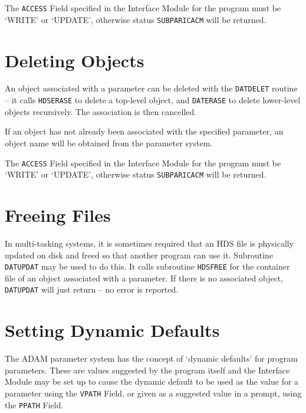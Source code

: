 \documentclass[twoside,11pt]{article}
\newcommand{\htmlref}[2]{#1}
\newcommand{\xref}[3]{#1}
\newcommand{\xlabel}[1]{}
\renewcommand{\_}{\texttt{\symbol{95}}}
\begin{document}
The
\xref{\texttt{ACCESS} Field}{sun115}{the_access_field}
specified in the Interface Module for the program must be `WRITE' or `UPDATE',
otherwise status \texttt{SUBPAR\_ICACM} will be returned.

\section{\xlabel{deleting_objects}Deleting Objects}
An object associated with a parameter can be deleted with the
\htmlref{\texttt{DAT\_DELET}}{DAT_DELET}
routine -- it calls
\xref{\texttt{HDS\_ERASE}}{sun92}{HDS_ERASE}
to delete a top-level object, and
\xref{\texttt{DAT\_ERASE}}{sun92}{DAT_ERASE}
to delete lower-level objects recursively.
The association is then cancelled.

If an object has not already been associated with the specified parameter,
an object name will be obtained from the parameter system.

The
\xref{\texttt{ACCESS} Field}{sun115}{the_access_field}
specified in the Interface Module for the program must be `WRITE' or `UPDATE',
otherwise status \texttt{SUBPAR\_ICACM} will be returned.

\section{\xlabel{freeing_files}Freeing Files}
In multi-tasking systems, it is sometimes required that an HDS file is
physically updated on disk and freed so that another program can use it.
Subroutine
\htmlref{\texttt{DAT\_UPDAT}}{DAT_UPDAT}
may be used to do this. It calls subroutine
\xref{\texttt{HDS\_FREE}}{sun92}{HDS_FREE}
for the container file of an object associated with a parameter.
If there is no associated object, \texttt{DAT\_UPDAT} will just return
-- no error is reported.

\section{\xlabel{setting_dynamic_defaults}Setting Dynamic Defaults}
The ADAM parameter system has the concept of `dynamic defaults' for program
parameters. These are values suggested by the program itself and the
\xref{Interface Module}{sun115}{abstract}
may be set up to cause the dynamic default to be used as the value for a
parameter using the
\xref{\texttt{VPATH} Field}{sun115}{the_vpath_field},
or given as a suggested value in a prompt, using the
\xref{\texttt{PPATH} Field}{sun115}{the_ppath_field}.
\end{document}
